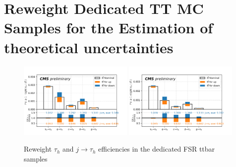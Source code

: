 \chapter{Reweight Dedicated TT MC Samples for the Estimation of theoretical uncertainties}

\begin{figure}
    \centering
    \includegraphics[width=0.49\textwidth]{chapters/Appendix/sectionTTSyst/figures/2020_MCRatio_fsr_tauGenFlavor_tauTight.png}
    \includegraphics[width=0.49\textwidth]{chapters/Appendix/sectionTTSyst/figures/2020_MCRatio_fsr_tauGenFlavor_tauVTight.png}
    \caption{Reweight $\tau_h$ and $j \to \tau_h$ efficiencies in the dedicated FSR ttbar samples}
    \label{fig:appendix:reweighttt:sf}
\end{figure}

